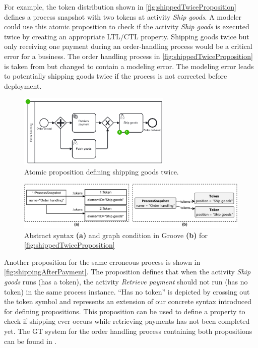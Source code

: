 \documentclass{lmcs} %
\begin{document}
For example, the token distribution shown in \autoref{fig:shippedTwiceProposition} defines a process snapshot with two tokens at activity \textit{Ship goods}.
A modeler could use this atomic proposition to check if the activity \textit{Ship goods} is executed twice by creating an appropriate LTL/CTL property.
Shipping goods twice but only receiving one payment during an order-handling process would be a critical error for a business.
The order handling process in \autoref{fig:shippedTwiceProposition} is taken from \cite{ruckerPracticalProcessAutomation2021} but changed to contain a modeling error.
The modeling error leads to potentially shipping goods twice if the process is not corrected before deployment.

\begin{figure}[ht]
    \centering
    \includegraphics[width=0.65\textwidth]{images/shippedTwiceProposition.pdf}
    \caption{Atomic proposition defining shipping goods twice.}
    \label{fig:shippedTwiceProposition}
\end{figure}

\begin{figure}[ht]
    \centering
    \includegraphics[width=1\textwidth]{images/twice.pdf}
    \caption{Abstract syntax \textbf{(a)} and graph condition in Groove \textbf{(b)} for \autoref{fig:shippedTwiceProposition}}
    \label{fig:shippedTwiceAbstractAndGroove}
\end{figure}

Another proposition for the same erroneous process is shown in \autoref{fig:shippingAfterPayment}.
The proposition defines that when the activity \textit{Ship goods} runs (has a token), the activity \textit{Retrieve payment} should not run (has no token) in the same process instance.
\enquote{Has no token} is depicted by crossing out the token symbol and represents an extension of our concrete syntax introduced for defining propositions.
This proposition can be used to define a property to check if shipping ever occurs while retrieving payments has not been completed yet.
The GT system for the order handling process containing both propositions can be found in \cite{timkrauterLMCS2024Artifacts2023}.
\end{document}
